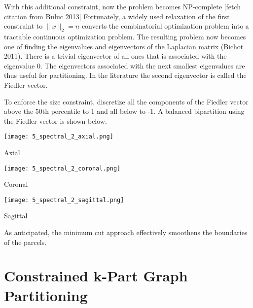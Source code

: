 With this additional constraint, now the problem becomes NP-complete [fetch citation from Buluc 2013]
Fortunately, a widely used relaxation of the first constraint to
$\| x \|_2 = n$ converts the combinatorial optimization problem into a
tractable continuous optimization problem. The resulting problem now
becomes one of finding the eigenvalues and eigenvectors of the Laplacian
matrix (Bichot 2011). There is a trivial eigenvector of all ones that is
associated with the eigenvalue 0. The eigenvectors associated with the
next smallest eigenvalues are thus useful for partitioning. In the
literature the second eigenvector is called the Fiedler vector.

To enforce the size constraint, discretize all the components of the
Fiedler vector above the 50th percentile to 1 and all below to -1. A
balanced bipartition using the Fiedler vector is shown below.

\begin{center}
\texttt{[image: 5\_spectral\_2\_axial.png]}

Axial

\texttt{[image: 5\_spectral\_2\_coronal.png]}

Coronal

\texttt{[image: 5\_spectral\_2\_sagittal.png]}

Sagittal
\end{center}

As anticipated, the minimum cut approach effectively smoothens the
boundaries of the parcels.

\section{Constrained k-Part Graph Partitioning}


